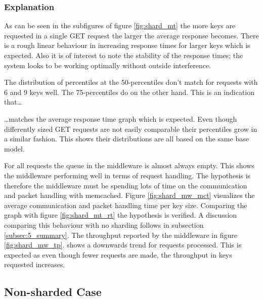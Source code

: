         \subsubsection{Explanation\label{subsubsec:5_sharded_summary}}

            As can be seen in the subfigures of figure \ref{fig:shard_mt} the more keys are requested in a single GET
            request the larger the average response becomes. There is a rough linear behaviour in increasing response
            times for larger keys which is expected. Also it is of interest to note the stability of the response times;
            the system looks to be working optimally without outside interference.

            The distribution of percentiles at the 50-percentiles don't match for requests with 6 and 9 keys well. The
            75-percentiles do on the other hand. This is an indication that\dots
            
            
            \dots matches the average response time graph which is expected.
            Even though differently sized GET requests are not easily comparable their percentiles grow in a similar
            fashion. This shows their distributions are all based on the same base model.

            For all requests the queue in the middleware is almost always empty. This shows the middleware performing
            well in terms of request handling. The hypothesis is therefore the middleware must be spending lots of time
            on the communication and packet handling with memcached. Figure \ref{fig:shard_mw_mct} visualizes the
            average communication and packet handling time per key size. Comparing the graph with figure
            \ref{fig:shard_mt_rt} the hypothesis is verified. A discussion comparing this behaviour with no sharding
            follows in subsection \ref{subsec:5_summary}.\newline
            The throughput reported by the middleware in figure \ref{fig:shard_mw_tp}. shows a downwards trend for
            requests processed. This is expected as even though fewer requests are made, the throughput in keys
            requested increases.

    \subsection{Non-sharded Case\label{subsec:5_nonsharded}}

